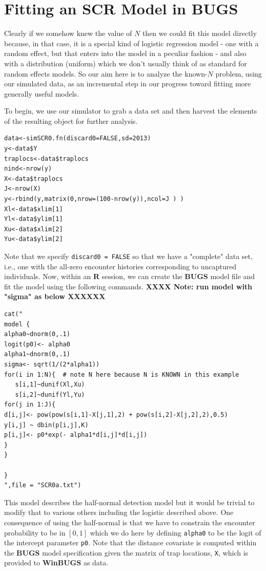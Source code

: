 \section{Fitting an SCR Model in BUGS}
\label{scr0.sec.winbugs1}

Clearly if we somehow knew the value of $N$ then we could fit this
model directly because, in that case, it is a special kind of logistic
regression model - one with a random effect, but that enters into the
model in a peculiar fashion - and also with a distribution (uniform)
which we don't usually think of as standard for random effects models.
So our aim here is to analyze the known-$N$ problem, using our
simulated data, as an incremental step in our progress toward fitting
more generally useful models.

To begin, we use our simulator to grab a data set and then harvest the
elements of the resulting object for further analysis.
\begin{verbatim}
data<-simSCR0.fn(discard0=FALSE,sd=2013)
y<-data$Y
traplocs<-data$traplocs
nind<-nrow(y)
X<-data$traplocs
J<-nrow(X)
y<-rbind(y,matrix(0,nrow=(100-nrow(y)),ncol=J ) )
Xl<-data$xlim[1]
Yl<-data$ylim[1]
Xu<-data$xlim[2]
Yu<-data$ylim[2]
\end{verbatim}

Note that we specify \mbox{\tt discard0 = FALSE} so that we have a
"complete" data set, i.e., one with the all-zero encounter histories
corresponding to uncaptured individuals. Now, within an {\bf R} session, we
can create the {\bf BUGS} model file and fit the model using the following
commands.  {\bf XXXX Note: run model with "sigma" as below XXXXXX}
{\small
\begin{verbatim}
cat("
model {
alpha0~dnorm(0,.1)
logit(p0)<- alpha0
alpha1~dnorm(0,.1)
sigma<- sqrt(1/(2*alpha1))
for(i in 1:N){  # note N here because N is KNOWN in this example
   s[i,1]~dunif(Xl,Xu)
   s[i,2]~dunif(Yl,Yu)    
for(j in 1:J){
d[i,j]<- pow(pow(s[i,1]-X[j,1],2) + pow(s[i,2]-X[j,2],2),0.5)
y[i,j] ~ dbin(p[i,j],K)
p[i,j]<- p0*exp(- alpha1*d[i,j]*d[i,j])
}
}

}
",file = "SCR0a.txt")
\end{verbatim}
}
This model describes the half-normal detection model but it
would be trivial to modify that to various others including the
logistic described above. One consequence of using the half-normal is
that we have to constrain the encounter probability to be in $[0,1]$
which we do here by defining \mbox{\tt alpha0} to be the logit of the
intercept parameter \mbox{\tt p0}. Note that the distance covariate is
computed within the {\bf BUGS} model specification given the matrix of trap
locations, \mbox{\tt X}, which is provided to {\bf WinBUGS} as data.

